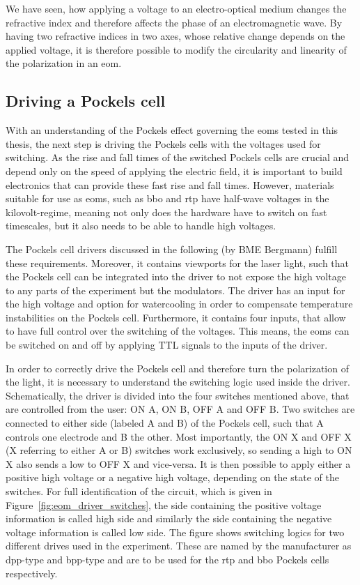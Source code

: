 We have seen, how applying a voltage to an electro-optical medium changes the refractive index and therefore affects the phase of an electromagnetic wave. By having two refractive indices in two axes, whose relative change depends on the applied voltage, it is therefore possible to modify the circularity and linearity of the polarization in an \acl{eom}.

\subsection{Driving a Pockels cell}%
\label{sec:pockels_cell_drive}

With an understanding of the Pockels effect governing the \acp{eom} tested in this thesis, the next step is driving the Pockels cells with the voltages used for switching. As the rise and fall times of the switched Pockels cells are crucial and depend only on the speed of applying the electric field, it is important to build electronics that can provide these fast rise and fall times. However, materials suitable for use as \acp{eom}, such as \ac{bbo} and \ac{rtp} have half-wave voltages in the kilovolt-regime, meaning not only does the hardware have to switch on fast timescales, but it also needs to be able to handle high voltages.

The Pockels cell drivers discussed in the following (by BME Bergmann) fulfill these requirements. Moreover, it contains viewports for the laser light, such that the Pockels cell can be integrated into the driver to not expose the high voltage to any parts of the experiment but the modulators. The driver has an input for the high voltage and option for watercooling in order to compensate temperature instabilities on the Pockels cell. Furthermore, it contains four inputs, that allow to have full control over the switching of the voltages. This means, the \acp{eom} can be switched on and off by applying TTL signals to the inputs of the driver.

In order to correctly drive the Pockels cell and therefore turn the polarization of the light, it is necessary to understand the switching logic used inside the driver. Schematically, the driver is divided into the four switches mentioned above, that are controlled from the user: ON A, ON B, OFF A and OFF B. Two switches are connected to either side (labeled A and B) of the Pockels cell, such that A controls one electrode and B the other. Most importantly, the ON X and OFF X (X referring to either A or B) switches work exclusively, so sending a high to ON X also sends a low to OFF X and vice-versa. It is then possible to apply either a positive high voltage or a negative high voltage, depending on the state of the switches. For full identification of the circuit, which is given in Figure~\ref{fig:eom_driver_switches}, the side containing the positive voltage information is called high side and similarly the side containing the negative voltage information is called low side. The figure shows switching logics for two different drives used in the experiment. These are named by the manufacturer as dpp-type and bpp-type and are to be used for the \ac{rtp} and \ac{bbo} Pockels cells respectively.

